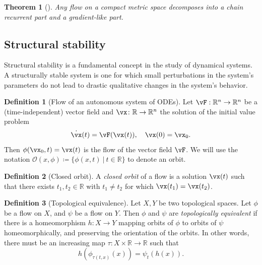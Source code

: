 \documentclass{article}
\newtheorem{theorem}{Theorem}
\theoremstyle{definition}
\newtheorem{definition}{Definition}
\theoremstyle{remark}
\newcommand{\reals}{\mathbb{R}}
\newcounter{ct}
\begin{document}
\begin{theorem}[\citep{conley1978morse}]
 Any flow on a compact metric space decomposes into a chain recurrent part and a gradient-like part.
\end{theorem}

\subsection{Structural stability}
\citep{peixoto1959ss, mane1987ss, hu1994ss, hayashi1997invariant, robbin1971ss, robinson1974ss, palis1970ss}

Structural stability is a fundamental concept in the study of dynamical systems. A structurally stable system is one for which small perturbations in the system's parameters do not lead to drastic qualitative changes in the system's behavior.

\begin{definition}[Flow of an autonomous system of ODEs]
Let $\vF: \reals^n\rightarrow \reals^n$ be a (time-independent) vector field and $\vx\colon\reals\rightarrow\reals^n$  the solution of the initial value problem
\[
\dot\vx(t) =  \vF(\vx(t)), \ \ \ \vx(0) = \vx_0.
\]
Then $ \phi (\vx_{0},t)=\vx(t)$ is the flow of the vector field $\vF$.
We will use the notation $\mathcal {O}(x,\phi)\coloneqq \{\phi(x,t)\ |\ t\in\reals\}$ to denote an orbit.
\end{definition}


\begin{definition}[Closed orbit]
A \emph{closed orbit} of a flow is a solution $\vx(t)$ such that there exists $t_1, t_2\in\reals$ with  $t_1\neq t_2$ for which $\vx(t_1) = \vx(t_2)$.
\end{definition}

\begin{definition}[Topological equivalence]
Let $X,Y$ be two topological spaces. Let $\phi$ be a flow on $X$, and $\psi$ be a flow on $Y$.
Then $\phi$ and $\psi$ are \emph{topologically equivalent} if there is a homeomorphism $h\colon X\to Y$ mapping orbits of  $\phi$  to orbits of $\psi$  homeomorphically, and preserving the orientation of the orbits. In other words, there must be  an increasing map $\tau\colon X\times\reals\rightarrow\reals$ such that 
\begin{equation}\label{eq:topeq}
h(\phi_{\tau(t,x)}(x)) = \psi_t(h(x)).
\end{equation}
\end{definition}
\end{document}

